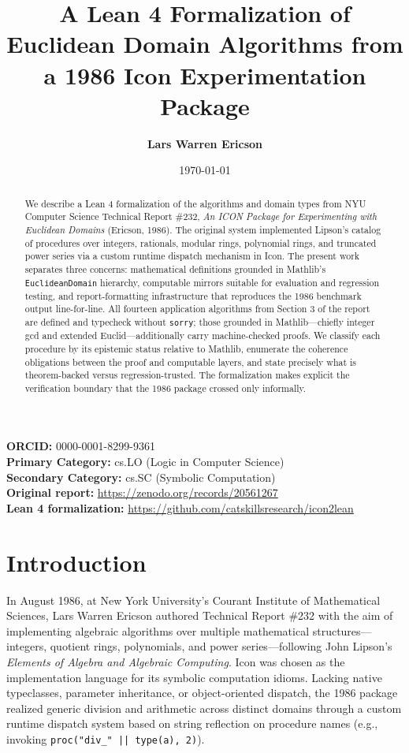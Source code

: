 \documentclass[11pt,a4paper]{article}
\title{\textbf{A Lean 4 Formalization of Euclidean Domain Algorithms from a 1986 Icon Experimentation Package}}
\author[1]{\textbf{Lars Warren Ericson}}
\affil[1]{Catskills Research Company}
\affil[1]{\texttt{lars.ericson@catskillsresearch.com}}
\date{\today}
\begin{document}
\maketitle

\begin{center}
  \small
  \textbf{ORCID:} 0000-0001-8299-9361 \\
  \textbf{Primary Category:} cs.LO (Logic in Computer Science) \\
  \textbf{Secondary Category:} cs.SC (Symbolic Computation) \\[0.5em]
  \textbf{Original report:} \url{https://zenodo.org/records/20561267} \\
  \textbf{Lean 4 formalization:} \url{https://github.com/catskillsresearch/icon2lean}
\end{center}

\begin{abstract}
We describe a Lean 4 formalization of the algorithms and domain types from NYU Computer Science Technical Report \#232, \emph{An ICON Package for Experimenting with Euclidean Domains} (Ericson, 1986). The original system implemented Lipson's catalog of procedures over integers, rationals, modular rings, polynomial rings, and truncated power series via a custom runtime dispatch mechanism in Icon. The present work separates three concerns: mathematical definitions grounded in Mathlib's \texttt{EuclideanDomain} hierarchy, computable mirrors suitable for evaluation and regression testing, and report-formatting infrastructure that reproduces the 1986 benchmark output line-for-line. All fourteen application algorithms from Section 3 of the report are defined and typecheck without \texttt{sorry}; those grounded in Mathlib---chiefly integer gcd and extended Euclid---additionally carry machine-checked proofs. We classify each procedure by its epistemic status relative to Mathlib, enumerate the coherence obligations between the proof and computable layers, and state precisely what is theorem-backed versus regression-trusted. The formalization makes explicit the verification boundary that the 1986 package crossed only informally.
\end{abstract}

\section{Introduction}
In August 1986, at New York University's Courant Institute of Mathematical Sciences, Lars Warren Ericson authored Technical Report \#232 with the aim of implementing algebraic algorithms over multiple mathematical structures---integers, quotient rings, polynomials, and power series---following John Lipson's \emph{Elements of Algebra and Algebraic Computing}. Icon was chosen as the implementation language for its symbolic computation idioms. Lacking native typeclasses, parameter inheritance, or object-oriented dispatch, the 1986 package realized generic division and arithmetic across distinct domains through a custom runtime dispatch system based on string reflection on procedure names (e.g., invoking \texttt{proc("div\_" || type(a), 2)}).
\end{document}

